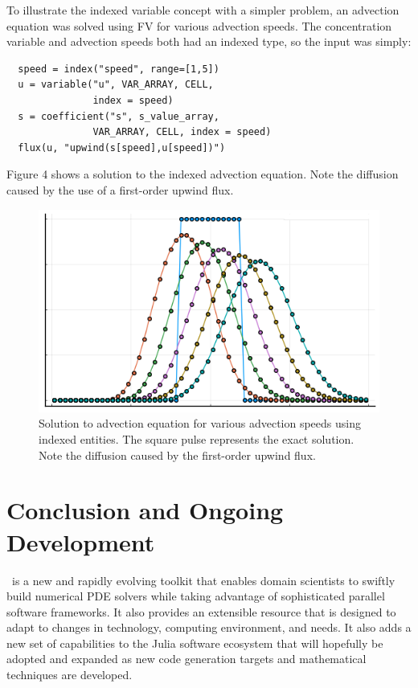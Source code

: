 \documentclass[twoside,leqno,twocolumn]{article}
\begin{document}
To illustrate the indexed variable concept with a simpler problem, an advection equation was solved using FV for various advection speeds. The concentration variable and advection speeds both had an indexed type, so the input was simply:
\begin{verbatim}
  speed = index("speed", range=[1,5])
  u = variable("u", VAR_ARRAY, CELL, 
               index = speed)
  s = coefficient("s", s_value_array, 
               VAR_ARRAY, CELL, index = speed)
  flux(u, "upwind(s[speed],u[speed])")
\end{verbatim}
Figure 4 shows a solution to the indexed advection equation. Note the diffusion caused by the use of a first-order upwind flux.
\begin{figure}
\label{fig:advec}
\includegraphics[width=\linewidth]{figures/addiff1dindexed.png}
\caption{Solution to advection equation for various advection speeds using indexed entities. The square pulse represents the exact solution. Note the diffusion caused by the first-order upwind flux.}
\end{figure}

\section{Conclusion and Ongoing Development}
\FMshop\ is a new and rapidly evolving toolkit that enables domain scientists to swiftly build numerical PDE solvers while taking advantage of sophisticated parallel software frameworks. It also provides an extensible resource that is designed to adapt to changes in technology, computing environment, and needs. It also adds a new set of capabilities to the Julia software ecosystem that will hopefully be adopted and expanded as new code generation targets and mathematical techniques are developed.
\end{document}

